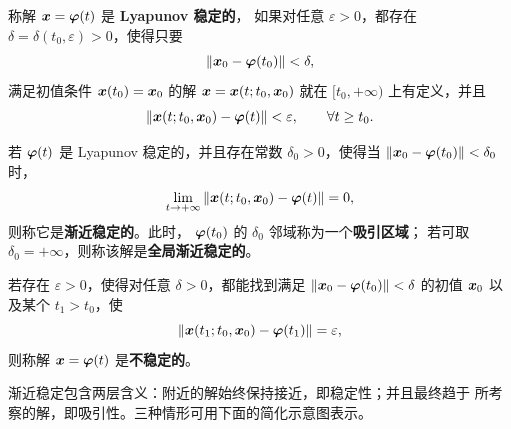 \begin{definition}\label{def:Lyapunov稳定性}
	称解 $\boldsymbol{x}=\boldsymbol{\varphi}(t)$ 是 \textbf{Lyapunov 稳定的}，
	如果对任意 $\varepsilon>0$，都存在
	$\delta=\delta(t_0,\varepsilon)>0$，使得只要
	\[
		\left\| \boldsymbol{x}_0-\boldsymbol{\varphi}(t_0) \right\|<\delta,
	\]
	满足初值条件 $\boldsymbol{x}(t_0)=\boldsymbol{x}_0$ 的解
	$\boldsymbol{x}=\boldsymbol{x}(t;t_0,\boldsymbol{x}_0)$ 就在
	$[t_0,+\infty)$ 上有定义，并且
	\[
		\left\| 
		\boldsymbol{x}(t;t_0,\boldsymbol{x}_0)-\boldsymbol{\varphi}(t)
		 \right\|<\varepsilon,
		\qquad \forall t\geq t_0.
	\]

	若 $\boldsymbol{\varphi}(t)$ 是 Lyapunov 稳定的，并且存在常数
	$\delta_0>0$，使得当
	$\left\| \boldsymbol{x}_0-\boldsymbol{\varphi}(t_0) \right\|<\delta_0$ 时，
	\[
		\lim_{t\to+\infty}
		\left\| 
		\boldsymbol{x}(t;t_0,\boldsymbol{x}_0)-\boldsymbol{\varphi}(t)
		 \right\|=0,
	\]
	则称它是\textbf{渐近稳定的}。此时，
	$\boldsymbol{\varphi}(t_0)$ 的 $\delta_0$ 邻域称为一个\textbf{吸引区域}；
	若可取 $\delta_0=+\infty$，则称该解是\textbf{全局渐近稳定的}。

	若存在 $\varepsilon>0$，使得对任意 $\delta>0$，都能找到满足
	$\left\| \boldsymbol{x}_0-\boldsymbol{\varphi}(t_0) \right\|<\delta$ 的初值
	$\boldsymbol{x}_0$ 以及某个 $t_1>t_0$，使
	\[
		\left\| 
		\boldsymbol{x}(t_1;t_0,\boldsymbol{x}_0)-\boldsymbol{\varphi}(t_1)
		 \right\|=\varepsilon,
	\]
	则称解 $\boldsymbol{x}=\boldsymbol{\varphi}(t)$ 是\textbf{不稳定的}。
\end{definition}

渐近稳定包含两层含义：附近的解始终保持接近，即稳定性；并且最终趋于
所考察的解，即吸引性。三种情形可用下面的简化示意图表示。

